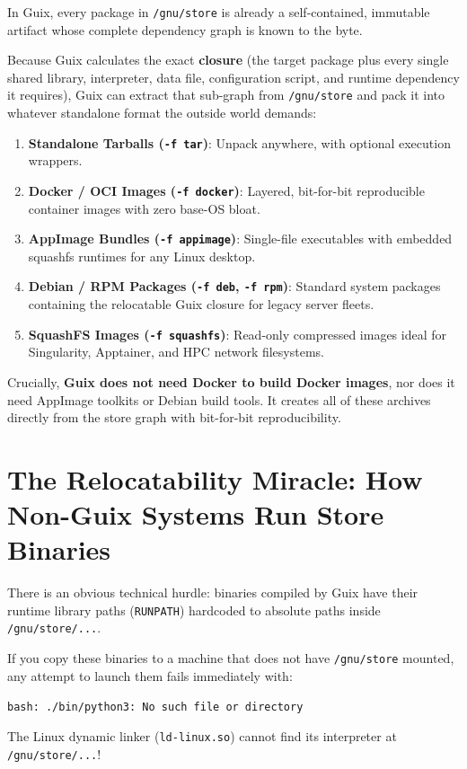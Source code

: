 In Guix, every package in \texttt{/gnu/store} is already a self-contained, immutable artifact whose complete dependency graph is known to the byte. 

Because Guix calculates the exact \textbf{closure} (the target package plus every single shared library, interpreter, data file, configuration script, and runtime dependency it requires), Guix can extract that sub-graph from \texttt{/gnu/store} and pack it into whatever standalone format the outside world demands:

\begin{enumerate}
  \item \textbf{Standalone Tarballs (\texttt{-f tar})}: Unpack anywhere, with optional execution wrappers.
  \item \textbf{Docker / OCI Images (\texttt{-f docker})}: Layered, bit-for-bit reproducible container images with zero base-OS bloat.
  \item \textbf{AppImage Bundles (\texttt{-f appimage})}: Single-file executables with embedded squashfs runtimes for any Linux desktop.
  \item \textbf{Debian / RPM Packages (\texttt{-f deb}, \texttt{-f rpm})}: Standard system packages containing the relocatable Guix closure for legacy server fleets.
  \item \textbf{SquashFS Images (\texttt{-f squashfs})}: Read-only compressed images ideal for Singularity, Apptainer, and HPC network filesystems.
\end{enumerate}

Crucially, \textbf{Guix does not need Docker to build Docker images}, nor does it need AppImage toolkits or Debian build tools. It creates all of these archives directly from the store graph with bit-for-bit reproducibility.

\section{The Relocatability Miracle: How Non-Guix Systems Run Store Binaries}

There is an obvious technical hurdle: binaries compiled by Guix have their runtime library paths (\texttt{RUNPATH}) hardcoded to absolute paths inside \texttt{/gnu/store/...}. 

If you copy these binaries to a machine that does not have \texttt{/gnu/store} mounted, any attempt to launch them fails immediately with:
\begin{center}
\texttt{bash: ./bin/python3: No such file or directory}
\end{center}
The Linux dynamic linker (\texttt{ld-linux.so}) cannot find its interpreter at \texttt{/gnu/store/...}!

